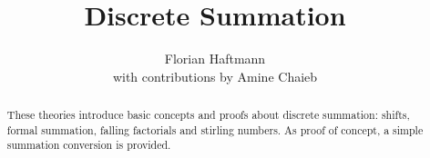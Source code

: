\documentclass[11pt,a4paper]{article}
\begin{document}
\title{Discrete Summation}
\author{Florian Haftmann \\ with contributions by Amine Chaieb}
\maketitle

\begin{abstract}
These theories introduce basic concepts and proofs about
discrete summation: shifts, formal summation, falling factorials
and stirling numbers.
As proof of concept, a simple summation conversion is provided.
\end{abstract}


\end{document}
